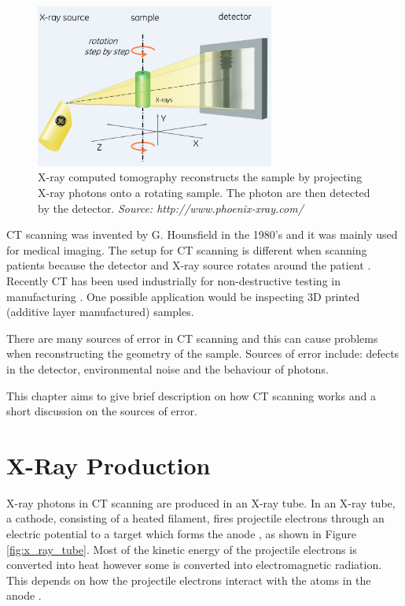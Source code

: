 \documentclass[12pt]{report}
\begin{document}
\begin{figure}
\centering
\includegraphics[width=0.7\textwidth]{figures/x_ray_ct.png}
\caption{X-ray computed tomography reconstructs the sample by projecting X-ray photons onto a rotating sample. The photon are then detected by the detector. \emph{Source: http://www.phoenix-xray.com/}}
\label{fig:x_ray_ct}
\end{figure}

CT scanning was invented by G. Hounsfield \cite{hounsfield1980computed} in the 1980's and it was mainly used for medical imaging. The setup for CT scanning is different when scanning patients because the detector and X-ray source rotates around the patient \cite{cantatore2011introduction}. Recently CT has been used industrially for non-destructive testing in manufacturing \cite{cantatore2011introduction}. One possible application would be inspecting 3D printed (additive layer manufactured) samples.

There are many sources of error in CT scanning \cite{cantatore2011introduction} and this can cause problems when reconstructing the geometry of the sample. Sources of error include: defects in the detector, environmental noise and the behaviour of photons.

This chapter aims to give brief description on how CT scanning works and a short discussion on the sources of error.

\section{X-Ray Production}
X-ray photons in CT scanning are produced in an X-ray tube. In an X-ray tube, a cathode, consisting of a heated filament, fires projectile electrons through an electric potential to a target which forms the anode \cite{michael2001x}, as shown in Figure \ref{fig:x_ray_tube}. Most of the kinetic energy of the projectile electrons is converted into heat however some is converted into electromagnetic radiation. This depends on how the projectile electrons interact with the atoms in the anode \cite{cantatore2011introduction}.
\end{document}
